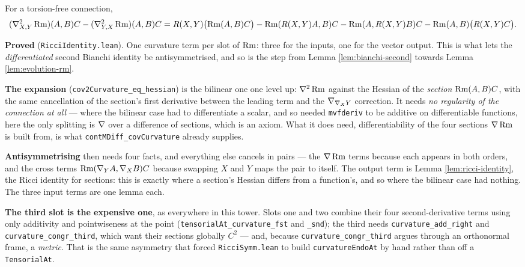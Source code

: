 \begin{lemma}
  \label{lem:curvature-ricci-identity}
  \leanok
  For a torsion-free connection,
  \[
    (\nabla^2_{X,Y}\operatorname{Rm})(A,B)C - (\nabla^2_{Y,X}\operatorname{Rm})(A,B)C
      = R(X,Y)\bigl(\operatorname{Rm}(A,B)C\bigr) - \operatorname{Rm}(R(X,Y)A,B)C - \operatorname{Rm}(A,R(X,Y)B)C
        - \operatorname{Rm}(A,B)\bigl(R(X,Y)C\bigr).
  \]

  \textbf{Proved} (\texttt{RicciIdentity.lean}). One curvature term per slot of
  $\operatorname{Rm}$: three for the inputs, one for the vector output. This is what lets the
  \emph{differentiated} second Bianchi identity be antisymmetrised, and so is
  the step from Lemma \ref{lem:bianchi-second} towards
  Lemma \ref{lem:evolution-rm}.

  \textbf{The expansion} (\texttt{cov2Curvature\_eq\_hessian}) is the bilinear
  one one level up: $\nabla^2\operatorname{Rm}$ against the Hessian of the \emph{section}
  $\operatorname{Rm}(A,B)C$, with the same cancellation of the section's first derivative
  between the leading term and the $\nabla_{\nabla_X Y}$ correction. It needs
  \emph{no regularity of the connection at all} --- where the bilinear case had
  to differentiate a scalar, and so needed \texttt{mvfderiv} to be additive on
  differentiable functions, here the only splitting is $\nabla$ over a difference
  of sections, which is an axiom. What it does need, differentiability of the
  four sections $\nabla\operatorname{Rm}$ is built from, is what
  \texttt{contMDiff\_covCurvature} already supplies.

  \textbf{Antisymmetrising} then needs four facts, and everything else cancels
  in pairs --- the $\nabla\operatorname{Rm}$ terms because each appears in both orders, and the
  cross terms $\operatorname{Rm}(\nabla_Y A, \nabla_X B)C$ because swapping $X$ and $Y$ maps the
  pair to itself. The output term is Lemma \ref{lem:ricci-identity}, the Ricci
  identity for sections: this is exactly where a section's Hessian differs from
  a function's, and so where the bilinear case had nothing. The three input
  terms are one lemma each.

  \textbf{The third slot is the expensive one}, as everywhere in this tower.
  Slots one and two combine their four second-derivative terms using only
  additivity and pointwiseness at the point (\texttt{tensorialAt\_curvature\_fst}
  and \texttt{\_snd}); the third needs \texttt{curvature\_add\_right} and
  \texttt{curvature\_congr\_third}, which want their sections globally $C^2$ ---
  and, because \texttt{curvature\_congr\_third} argues through an orthonormal
  frame, a \emph{metric}. That is the same asymmetry that forced
  \texttt{RicciSymm.lean} to build \texttt{curvatureEndoAt} by hand rather than
  off a \texttt{TensorialAt}.
\end{lemma}

